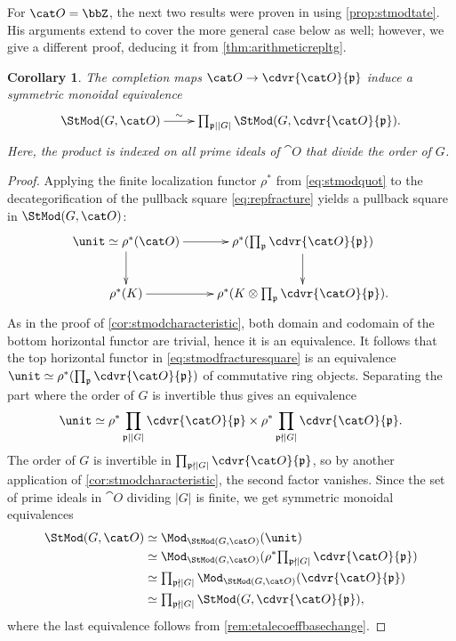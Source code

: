\documentclass{amsart}%
\numberwithin{equation}{section}%
\newtheorem{Cor}[equation]{Corollary}
\theoremstyle{remark}
\begin{document}
For $\cat O = \bbZ$, the next two results were proven in \cite[Prop.~5.2]{krause_picard} using \cref{prop:stmodtate}. His arguments extend to cover the more general case below as well; however, we give a different proof, deducing it from \cref{thm:arithmeticrepltg}.

\begin{Cor}\label{cor:arithmeticstmodltg1}
The completion maps $\cat O \to \cdvr{\cat O}{\frak p}$ induce a symmetric monoidal equivalence
\begin{equation}\label{eq:stmodfracture1}
    \vcenter{
        \xymatrix{\StMod(G,\cat O) \ar[r]^-{\sim} & \prod_{\frak p\mid |G|}\StMod(G, \cdvr{\cat O}{\frak p}).}
    }
\end{equation}
Here, the product is indexed on all prime ideals of $\cat O$ that divide the order of $G$.
\end{Cor}
\begin{proof}
Applying the finite localization functor $\rho^*$ from \eqref{eq:stmodquot} to the decategorification of the pullback square \eqref{eq:repfracture} yields a pullback square in $\StMod(G,\cat O)$:
\begin{equation}\label{eq:stmodfracturesquare}
    \vcenter{
        \xymatrix{\unit \simeq \rho^*(\cat O) \ar[r] \ar[d] & \rho^*(\prod_{\frak p}\cdvr{\cat O}{\frak p}) \ar[d] \\
        \rho^*(K) \ar[r] & \rho^*(K\otimes\prod_{\frak p}\cdvr{\cat O}{\frak p}).}
    }
\end{equation}
As in the proof of \cref{cor:stmodcharacteristic}, both domain and codomain of the bottom horizontal functor are trivial, hence it is an equivalence. It follows that the top horizontal functor in \eqref{eq:stmodfracturesquare} is an equivalence $\unit \simeq \rho^*(\prod_{\frak p}\cdvr{\cat O}{\frak p})$ of commutative ring objects. Separating the part where the order of $G$ is invertible thus gives an equivalence 
\[
\unit \simeq \rho^*\prod_{\frak p\mid |G|}\cdvr{\cat O}{\frak p} \times \rho^*\prod_{\frak p\nmid |G|}\cdvr{\cat O}{\frak p}.
\]
The order of $G$ is invertible in $\prod_{\frak p\nmid |G|}\cdvr{\cat O}{\frak p}$, so by another application of \cref{cor:stmodcharacteristic}, the second factor vanishes. Since the set of prime ideals in $\cat O$ dividing $|G|$ is finite, we get symmetric monoidal equivalences
\begin{align*}
\StMod(G,\cat O) & \simeq \Mod_{\StMod(G,\cat O)}(\unit) \\
& \simeq \Mod_{\StMod(G,\cat O)}(\rho^*\textstyle{\prod_{\frak p\nmid |G|}\cdvr{\cat O}{\frak p}}) \\
& \simeq \textstyle{\prod_{\frak p\nmid |G|}\Mod_{\StMod(G,\cat O)}(\cdvr{\cat O}{\frak p})} \\
& \simeq \textstyle{\prod_{\frak p\nmid |G|}\StMod(G,\cdvr{\cat O}{\frak p})},
\end{align*}
where the last equivalence follows from \cref{rem:etalecoeffbasechange}.
\end{proof}
\end{document}

